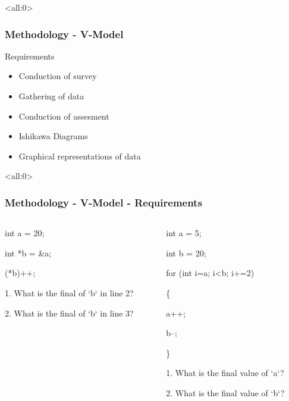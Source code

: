 \documentclass[handout]{beamer}
\begin{document}
\begin{frame}<all:0>
	\frametitle{Methodology - V-Model}
	\begin{block}{Requirements}
		\begin{itemize}
			\item<1-> Conduction of survey
			\item<2-> Gathering of data
			\item<3-> Conduction of assesment
		\end{itemize}

		\begin{itemize}
			\item<4-> Ishikawa Diagrams
			\item<5-> Graphical representations of data
		\end{itemize}
	\end{block}
\end{frame}

\begin{frame}<all:0>
	\frametitle{Methodology - V-Model - Requirements}

	\begin{columns}
		\begin{column}{.5\linewidth}
			\begin{semiverbatim}
				int a = 20;

				int *b = \&a;

				(*b)++;

				1. What is the final of `b` in line 2?

				2. What is the final of `b` in line 3?
			\end{semiverbatim}
		\end{column}

		\begin{column}{.5\linewidth}
			\begin{semiverbatim}
				int a = 5;

				int b = 20;

				for (int i=a; i<b; i+=2)

				\{

						a++;

						b--;

				\}

				1. What is the final value of `a`?

				2. What is the final value of `b`?
			\end{semiverbatim}
		\end{column}
	\end{columns}
\end{frame}
\end{document}

